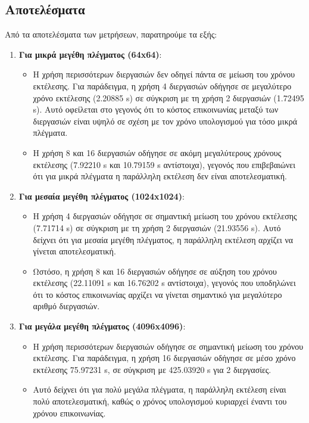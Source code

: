 \documentclass{article}
\begin{document}
\subsection*{Αποτελέσματα}
Από τα αποτελέσματα των μετρήσεων, παρατηρούμε τα εξής:
\begin{enumerate}
    \item \textbf{Για μικρά μεγέθη πλέγματος (64x64)}:
    \begin{itemize}
        \item Η χρήση περισσότερων διεργασιών δεν οδηγεί πάντα σε μείωση του χρόνου εκτέλεσης. Για παράδειγμα, η χρήση 4 διεργασιών οδήγησε σε μεγαλύτερο χρόνο εκτέλεσης (2.20885 s) σε σύγκριση με τη χρήση 2 διεργασιών (1.72495 s). Αυτό οφείλεται στο γεγονός ότι το κόστος επικοινωνίας μεταξύ των διεργασιών είναι υψηλό σε σχέση με τον χρόνο υπολογισμού για τόσο μικρά πλέγματα.
        \item Η χρήση 8 και 16 διεργασιών οδήγησε σε ακόμη μεγαλύτερους χρόνους εκτέλεσης (7.92210 s και 10.79159 s αντίστοιχα), γεγονός που επιβεβαιώνει ότι για μικρά πλέγματα η παράλληλη εκτέλεση δεν είναι αποτελεσματική.
    \end{itemize}
    \item \textbf{Για μεσαία μεγέθη πλέγματος (1024x1024)}:
    \begin{itemize}
        \item Η χρήση 4 διεργασιών οδήγησε σε σημαντική μείωση του χρόνου εκτέλεσης (7.71714 s) σε σύγκριση με τη χρήση 2 διεργασιών (21.93556 s). Αυτό δείχνει ότι για μεσαία μεγέθη πλέγματος, η παράλληλη εκτέλεση αρχίζει να γίνεται αποτελεσματική.
        \item Ωστόσο, η χρήση 8 και 16 διεργασιών οδήγησε σε αύξηση του χρόνου εκτέλεσης (22.11091 s και 16.76202 s αντίστοιχα), γεγονός που υποδηλώνει ότι το κόστος επικοινωνίας αρχίζει να γίνεται σημαντικό για μεγαλύτερο αριθμό διεργασιών.
    \end{itemize}
    \item \textbf{Για μεγάλα μεγέθη πλέγματος (4096x4096)}:
    \begin{itemize}
        \item Η χρήση περισσότερων διεργασιών οδήγησε σε σημαντική μείωση του χρόνου εκτέλεσης. Για παράδειγμα, η χρήση 16 διεργασιών οδήγησε σε μέσο χρόνο εκτέλεσης 75.97231 s, σε σύγκριση με 425.03920 s για 2 διεργασίες.
        \item Αυτό δείχνει ότι για πολύ μεγάλα πλέγματα, η παράλληλη εκτέλεση είναι πολύ αποτελεσματική, καθώς ο χρόνος υπολογισμού κυριαρχεί έναντι του χρόνου επικοινωνίας.
    \end{itemize}
\end{enumerate}
\end{document}
